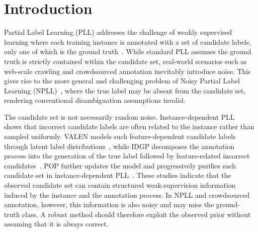 \section{Introduction} \label{sec:intro}

Partial Label Learning (PLL) addresses the challenge of weakly supervised learning where each training instance is annotated with a set of candidate labels, only one of which is the ground truth~\cite{cour2009learning, zhang2015solving, feng2020provably}. While standard PLL assumes the ground truth is strictly contained within the candidate set, real-world scenarios such as web-scale crawling and crowdsourced annotation inevitably introduce noise. This gives rise to the more general and challenging problem of Noisy Partial Label Learning (NPLL)~\cite{wang2022pico+}, where the true label may be absent from the candidate set, rendering conventional disambiguation assumptions invalid.

The candidate set is not necessarily random noise. Instance-dependent PLL shows that incorrect candidate labels are often related to the instance rather than sampled uniformly. VALEN models such feature-dependent candidate labels through latent label distributions~\cite{xu2021idpll}, while IDGP decomposes the annotation process into the generation of the true label followed by feature-related incorrect candidates~\cite{qiao2023idgp}. POP further updates the model and progressively purifies each candidate set in instance-dependent PLL~\cite{xu2022pop}. These studies indicate that the observed candidate set can contain structured weak-supervision information induced by the instance and the annotation process. In NPLL and crowdsourced annotation, however, this information is also noisy and may miss the ground-truth class. A robust method should therefore exploit the observed prior without assuming that it is always correct.

